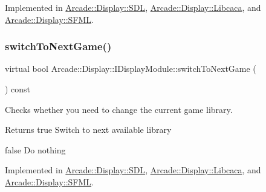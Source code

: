 Implemented in \mbox{\hyperlink{classArcade_1_1Display_1_1SDL_a044e009d7fc03813fce09abed3a6694c}{Arcade\+::\+Display\+::\+S\+DL}}, \mbox{\hyperlink{classArcade_1_1Display_1_1Libcaca_aaa4a4a114dee18576dd93ca09808004e}{Arcade\+::\+Display\+::\+Libcaca}}, and \mbox{\hyperlink{classArcade_1_1Display_1_1SFML_a3072fbe4dd92685154da10cbd602bc3b}{Arcade\+::\+Display\+::\+S\+F\+ML}}.

\mbox{\label{classArcade_1_1Display_1_1IDisplayModule_a9584cb0ca3b157c9a4ec94509e4f8e32}} 
\subsubsection{\texorpdfstring{switchToNextGame()}{switchToNextGame()}}
{\footnotesize\ttfamily virtual bool Arcade\+::\+Display\+::\+I\+Display\+Module\+::switch\+To\+Next\+Game (\begin{DoxyParamCaption}{ }\end{DoxyParamCaption}) const\hspace{0.3cm}{\ttfamily [pure virtual]}}



Checks whether you need to change the current game library. 

\begin{DoxyReturn}{Returns}
true Switch to next available library 

false Do nothing 
\end{DoxyReturn}


Implemented in \mbox{\hyperlink{classArcade_1_1Display_1_1SDL_a3f197b6ea176410b4eb472d7e848eb10}{Arcade\+::\+Display\+::\+S\+DL}}, \mbox{\hyperlink{classArcade_1_1Display_1_1Libcaca_ab9f5be320196e902e43db50e0cdcce5e}{Arcade\+::\+Display\+::\+Libcaca}}, and \mbox{\hyperlink{classArcade_1_1Display_1_1SFML_af47adddb8c2f26b5ee0109abce03e27a}{Arcade\+::\+Display\+::\+S\+F\+ML}}.

\mbox{\label{classArcade_1_1Display_1_1IDisplayModule_a0de47361c9d47bf8fc52070b945f23b7}} 
